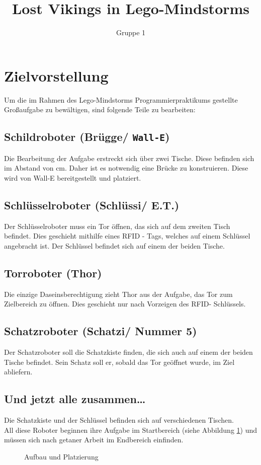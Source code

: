 \documentclass[a4paper]{scrartcl}
\title{Lost Vikings in Lego-Mindstorms}
\author{Gruppe 1}
\date{}
\begin{document}
	\maketitle
	\section{Zielvorstellung}
	Um die im Rahmen des Lego-Mindstorms Programmierpraktikums gestellte Großaufgabe zu bewältigen, sind folgende Teile zu bearbeiten:
	\subsection{Schildroboter (Brügge/ \texttt{Wall-E})}
	Die Bearbeitung der Aufgabe erstreckt sich über zwei Tische. Diese befinden sich im Abstand von \unit[15]{cm}. Daher ist es notwendig eine Brücke zu konstruieren. Diese wird von Wall-E bereitgestellt und platziert.
	\subsection{Schlüsselroboter (Schlüssi/ E.T.)}
	Der Schlüsselroboter muss ein Tor öffnen, das sich auf dem zweiten Tisch befindet. Dies geschieht mithilfe eines RFID%
- Tags, welches auf einem Schlüssel angebracht ist. Der Schlüssel befindet sich auf einem der beiden Tische.
	\subsection{Torroboter (Thor)}
	Die einzige Daseinsberechtigung zieht Thor aus der Aufgabe, das Tor zum Zielbereich zu öffnen. Dies geschieht nur nach Vorzeigen des RFID- Schlüssels.
	\subsection{Schatzroboter (Schatzi/ Nummer 5)}
	Der Schatzroboter soll die Schatzkiste finden, die sich auch auf einem der beiden Tische befindet. Sein Schatz soll er, sobald das Tor geöffnet wurde, im Ziel abliefern.
	\subsection{Und jetzt alle zusammen\dots}
	Die Schatzkiste und der Schlüssel befinden sich auf verschiedenen Tischen. \\
	All diese Roboter beginnen ihre Aufgabe im Startbereich (siehe Abbildung \ref{bild_tisch}) und müssen sich nach getaner Arbeit im Endbereich einfinden.
	\begin{figure}[H]
		\centering
		\def\svgwidth{14cm}
		
		\caption{Aufbau und Platzierung}
		\label{bild_tisch}
	\end{figure}
\end{document}
